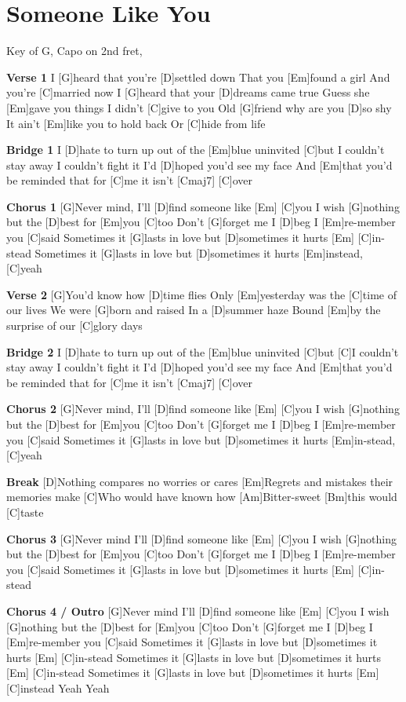 \documentclass[../../songbookMain]{subfiles}
\begin{document}
\section{Someone Like You}
{\tiny
Key of G, Capo on 2nd fret,
}

\begin{guitar}
\textbf{Verse 1}
I [G]heard that you're [D]settled down 
That you [Em]found a girl 
And you're [C]married now 
I [G]heard that your [D]dreams came true 
Guess she [Em]gave you things 
I didn't [C]give to you 
Old [G]friend why are you [D]so shy 
It ain't [Em]like you to hold back 
Or [C]hide from life 
 
\textbf{Bridge 1}
I [D]hate to turn up out of the [Em]blue uninvited [C]but 
I couldn't stay away I couldn't fight it
I'd [D]hoped you'd see my face 
And [Em]that you'd be reminded that for [C]me it isn't [Cmaj7] [C]over 
 
\textbf{Chorus 1}
[G]Never mind, I'll [D]find someone like [Em] [C]you 
I wish [G]nothing but the [D]best for [Em]you [C]too 
Don't [G]forget me I [D]beg I [Em]re-member you [C]said 
Sometimes it [G]lasts in love but [D]sometimes it hurts [Em] [C]in-stead 
Sometimes it [G]lasts in love but [D]sometimes it hurts [Em]instead, [C]yeah 

\textbf{Verse 2}
[G]You'd know how [D]time flies 
Only [Em]yesterday 
was the [C]time of our lives 
We were [G]born and raised 
In a [D]summer haze 
Bound [Em]by the surprise of our [C]glory days 
 
\textbf{Bridge 2}
I [D]hate to turn up out of the [Em]blue uninvited [C]but 
[C]I couldn't stay away I couldn't fight it 
I'd [D]hoped you'd see my face 
And [Em]that you'd be reminded that for [C]me it isn't [Cmaj7] [C]over 
 
\textbf{Chorus 2}
[G]Never mind, I'll [D]find someone like [Em] [C]you 
I wish [G]nothing but the [D]best for [Em]you [C]too 
Don't [G]forget me I [D]beg I [Em]re-member you [C]said 
Sometimes it [G]lasts in love but [D]sometimes it hurts [Em]in-stead, [C]yeah 
 
\textbf{Break}
[D]Nothing compares no worries or cares 
[Em]Regrets and mistakes their memories make 
[C]Who would have known how 
[Am]Bitter-sweet [Bm]this would [C]taste 
 
\textbf{Chorus 3}
[G]Never mind I’ll [D]find someone like [Em] [C]you 
I wish [G]nothing but the [D]best for [Em]you [C]too 
Don't [G]forget me I [D]beg I [Em]re-member you [C]said 
Sometimes it [G]lasts in love but [D]sometimes it hurts [Em] [C]in-stead 

\textbf{Chorus 4 / Outro}
[G]Never mind I’ll [D]find someone like [Em] [C]you 
I wish [G]nothing but the [D]best for [Em]you [C]too 
Don't [G]forget me I [D]beg I [Em]re-member you [C]said 
Sometimes it [G]lasts in love but [D]sometimes it hurts [Em] [C]in-stead 
Sometimes it [G]lasts in love but [D]sometimes it hurts [Em] [C]in-stead 
Sometimes it [G]lasts in love but [D]sometimes it hurts [Em] [C]instead 
Yeah Yeah
\end{guitar}
\end{document}
